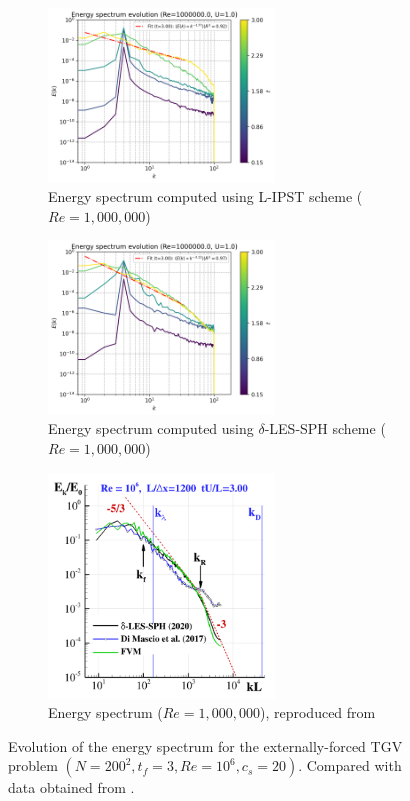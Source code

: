 \begin{figure}[htbp!]
  \begin{subfigure}{7cm}
  \centering\includegraphics[width=6cm]{Code-Figures/ext-force-tgv/c0_20_tait_hdx_2_pec_dtmul_1_sd_n_o_files_80_nx_200_pst_10_re_1000000_tsph_wcsph_tf_3/energy_spectrum_evolution_all.png}
  \caption{Energy spectrum computed using L-IPST scheme ($Re = 1,000,000$)}
  \end{subfigure}
  \begin{subfigure}{7cm}
  \centering\includegraphics[width=6cm]{Code-Figures/ext-force-tgv/c0_20_tait_hdx_2_rk2_dtmul_1.5_n_o_files_80_nx_200_pst_10_re_1000000_deltales_tf_3/energy_spectrum_evolution_all.png}
  \caption{Energy spectrum computed using $\delta$-LES-SPH scheme ($Re = 1,000,000$)}
  \end{subfigure}
  \begin{subfigure}{7cm}
  \centering\includegraphics[width=6cm]{Code-Figures/ext-force-tgv/colag_ek_t_3.png}
  \caption{Energy spectrum ($Re = 1,000,000$), reproduced from \cite{Colagrossi2021QuasiLagrangian}}
  \end{subfigure}
  \caption{Evolution of the energy spectrum for the externally-forced TGV problem $(N=200^2, t_f=3, Re=10^6, c_s=20)$. Compared with data obtained from \cite{Colagrossi2021QuasiLagrangian}.}
  \label{fig:tgv-forced-espec}
\end{figure}

